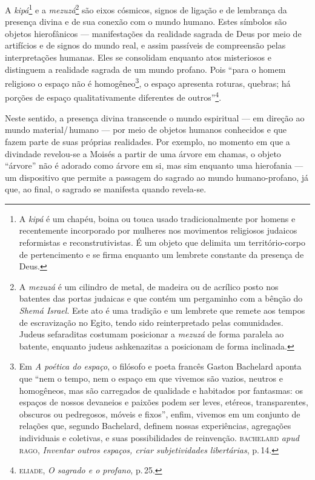\noindent{}A \emph{kipá}\footnote{A \emph{kipá} é um chapéu, boina ou touca usado
  tradicionalmente por homens e recentemente incorporado por mulheres
  nos movimentos religiosos judaicos reformistas e reconstrutivistas. É
  um objeto que delimita um território-corpo de pertencimento e se firma
  enquanto um lembrete constante da presença de Deus.} e a
\emph{mezuzá}\footnote{A \emph{mezuzá} é um cilindro de metal, de
  madeira ou de acrílico posto nos batentes das portas judaicas e que
  contém um pergaminho com a bênção do \emph{Shemá Israel}. Este ato é
  uma tradição e um lembrete que remete aos tempos de escravização no
  Egito, tendo sido reinterpretado pelas comunidades. Judeus
  sefaraditas costumam posicionar a \emph{mezuzá} de forma
  paralela ao batente, enquanto judeus ashkenazitas a posicionam
  de forma inclinada.} são eixos cósmicos, signos de ligação e de
lembrança da presença divina e de sua conexão com o mundo humano. Estes
símbolos são objetos hierofânicos --- manifestações da realidade sagrada
de Deus por meio de artifícios e de signos do mundo real, e assim
passíveis de compreensão pelas interpretações humanas. Eles se
consolidam enquanto atos misteriosos e distinguem a realidade sagrada de
um mundo profano. Pois ``para o homem religioso o espaço não é
homogêneo\footnote{Em \emph{A poética do espaço}, o filósofo e poeta
  francês Gaston Bachelard aponta que ``nem o tempo, nem o espaço
  em que vivemos são vazios, neutros e homogêneos, mas são carregados de
  qualidade e habitados por fantasmas: os espaços de nossos devaneios e
  paixões podem ser leves, etéreos, transparentes, obscuros ou
  pedregosos, móveis e fixos'', enfim, vivemos em um conjunto de
  relações que, segundo Bachelard, definem nossas experiências,
  agregações individuais e coletivas, e suas possibilidades de
  reinvenção. \textsc{bachelard} \emph{apud} \textsc{rago}, \emph{Inventar outros espaços, criar
  subjetividades libertárias}, p.\,14.}, o espaço apresenta
roturas, quebras; há porções de espaço qualitativamente diferentes de
outros''\footnote{\textsc{eliade}, \emph{O sagrado e o profano}, p.\,25.}.

Neste sentido, a presença divina transcende o mundo espiritual --- em
direção ao mundo material/\,humano --- por meio de objetos humanos
conhecidos e que fazem parte de suas próprias realidades. Por exemplo,
no momento em que a divindade revelou-se a Moisés a partir de uma árvore
em chamas, o objeto ``árvore'' não é adorado como árvore em si, mas sim
enquanto uma hierofania --- um dispositivo que permite a passagem do
sagrado ao mundo humano-profano, já que, ao final, o sagrado se
manifesta quando revela-se.

